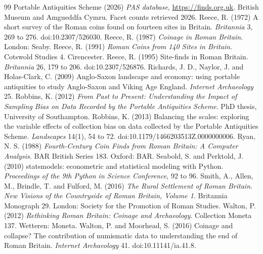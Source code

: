 \documentclass[11pt,a4paper]{article}
\begin{document}
\begin{thebibliography}{99}
 Portable Antiquities Scheme (2026) \textit{PAS database}, \url{https://finds.org.uk}. British Museum and Amgueddfa Cymru. Facet counts retrieved 2026.
 Reece, R. (1972) A short survey of the Roman coins found on fourteen sites in Britain. \textit{Britannia} 3, 269 to 276. doi:10.2307/526030.
 Reece, R. (1987) \textit{Coinage in Roman Britain}. London: Seaby.
 Reece, R. (1991) \textit{Roman Coins from 140 Sites in Britain}. Cotswold Studies 4. Cirencester.
 Reece, R. (1995) Site-finds in Roman Britain. \textit{Britannia} 26, 179 to 206. doi:10.2307/526876.
 Richards, J. D., Naylor, J. and Holas-Clark, C. (2009) Anglo-Saxon landscape and economy: using portable antiquities to study Anglo-Saxon and Viking Age England. \textit{Internet Archaeology} 25.
 Robbins, K. (2012) \textit{From Past to Present: Understanding the Impact of Sampling Bias on Data Recorded by the Portable Antiquities Scheme}. PhD thesis, University of Southampton.
 Robbins, K. (2013) Balancing the scales: exploring the variable effects of collection bias on data collected by the Portable Antiquities Scheme. \textit{Landscapes} 14(1), 54 to 72. doi:10.1179/1466203513Z.0000000006.
 Ryan, N. S. (1988) \textit{Fourth-Century Coin Finds from Roman Britain: A Computer Analysis}. BAR British Series 183. Oxford: BAR.
 Seabold, S. and Perktold, J. (2010) statsmodels: econometric and statistical modeling with Python. \textit{Proceedings of the 9th Python in Science Conference}, 92 to 96.
 Smith, A., Allen, M., Brindle, T. and Fulford, M. (2016) \textit{The Rural Settlement of Roman Britain. New Visions of the Countryside of Roman Britain, Volume 1}. Britannia Monograph 29. London: Society for the Promotion of Roman Studies.
 Walton, P. (2012) \textit{Rethinking Roman Britain: Coinage and Archaeology}. Collection Moneta 137. Wetteren: Moneta.
 Walton, P. and Moorhead, S. (2016) Coinage and collapse? The contribution of numismatic data to understanding the end of Roman Britain. \textit{Internet Archaeology} 41. doi:10.11141/ia.41.8.
\end{thebibliography}

\appendix
\end{document}
